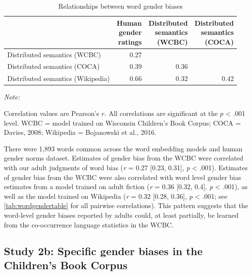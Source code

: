 \documentclass[
  english,
  ,man,floatsintext]{apa6}
\begin{document}
\begin{table}

\caption{\label{tab:wordgendertable}Relationships between word gender biases}
\centering
\fontsize{7}{9}\selectfont
\begin{threeparttable}
\begin{tabular}[t]{lrrr}
\toprule
 & \makecell[l]{Human\\gender\\ratings} & \makecell[l]{Distributed\\semantics\\(WCBC)} & \makecell[l]{Distributed\\semantics\\(COCA)}\\
\midrule
Distributed semantics (WCBC) & 0.27 &  & \\
Distributed semantics (COCA) & 0.39 & 0.36 & \\
Distributed semantics (Wikipedia) & 0.66 & 0.32 & 0.42\\
\bottomrule
\end{tabular}
\begin{tablenotes}[para]
\item \textit{Note:} 
\item Correlation values are Pearson's $r$. All correlations are significant at the $p$ < .001 level. WCBC = model trained on Wisconsin Children’s Book Corpus; COCA = Davies, 2008; Wikipedia = Bojanowski et al., 2016.
\end{tablenotes}
\end{threeparttable}
\end{table}

There were 1,893 words common across the word embedding models and human gender norms dataset. Estimates of gender bias from the WCBC were correlated with our adult judgments of word bias (\emph{r} = 0.27 {[}0.23, 0.31{]}, \emph{p} \textless{} .001). Estimates of gender bias from the WCBC were also correlated with word level gender bias estimates from a model trained on adult fiction (\emph{r} = 0.36 {[}0.32, 0.4{]}, \emph{p} \textless{} .001), as well as the model trained on Wikipedia (\emph{r} = 0.32 {[}0.28, 0.36{]}, \emph{p} \textless{} .001; see \autoref{tab:wordgendertable} for all pairwise correlations). This pattern suggests that the word-level gender biases reported by adults could, at least partially, be learned from the co-occurrence language statistics in the WCBC.

\hypertarget{study-2b-specific-gender-biases-in-the-childrens-book-corpus}{%
\subsection{Study 2b: Specific gender biases in the Children's Book Corpus}\label{study-2b-specific-gender-biases-in-the-childrens-book-corpus}}
\end{document}
